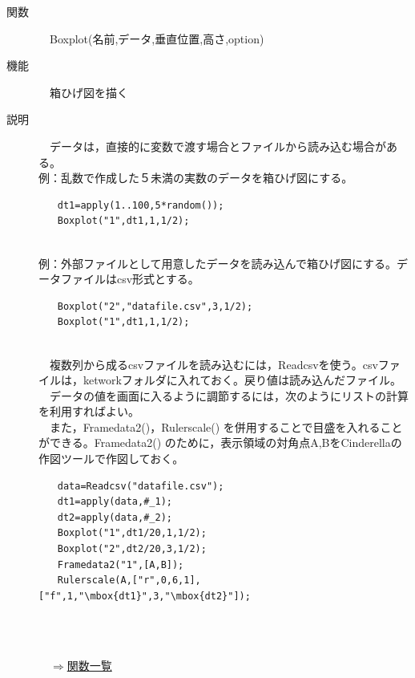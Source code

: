 \documentclass[papersize,a4paper,12pt,uplatex]{jsarticle}
\begin{document}
\begin{description}
\hypertarget{boxplot}{}
\item[関数]　Boxplot(名前,データ,垂直位置,高さ,option)
\item[機能]　箱ひげ図を描く
\item[説明]　データは，直接的に変数で渡す場合とファイルから読み込む場合がある。\\
例：乱数で作成した５未満の実数のデータを箱ひげ図にする。\\
\begin{verbatim}
　　dt1=apply(1..100,5*random());
　　Boxplot("1",dt1,1,1/2);
\end{verbatim}
　\\
例：外部ファイルとして用意したデータを読み込んで箱ひげ図にする。データファイルはcsv形式とする。\\
\begin{verbatim}
　　Boxplot("2","datafile.csv",3,1/2);
　　Boxplot("1",dt1,1,1/2);
\end{verbatim}
　\\
　複数列から成るcsvファイルを読み込むには，Readcsvを使う。csvファイルは，ketworkフォルダに入れておく。戻り値は読み込んだファイル。\\
　データの値を画面に入るように調節するには，次のようにリストの計算を利用すればよい。\\
 　また，Framedata2()，Rulerscale() を併用することで目盛を入れることができる。Framedata2() のために，表示領域の対角点A,BをCinderellaの作図ツールで作図しておく。\\
\begin{verbatim}
　　data=Readcsv("datafile.csv");
　　dt1=apply(data,#_1);
　　dt2=apply(data,#_2);
　　Boxplot("1",dt1/20,1,1/2);
　　Boxplot("2",dt2/20,3,1/2);
　　Framedata2("1",[A,B]);
　　Rulerscale(A,["r",0,6,1],["f",1,"\mbox{dt1}",3,"\mbox{dt2}"]);
\end{verbatim}
　\\
　　　　　\\

\begin{flushright}　\hyperlink{functionlist}{$\Rightarrow$関数一覧}\end{flushright}


\end{description}
\end{document}
